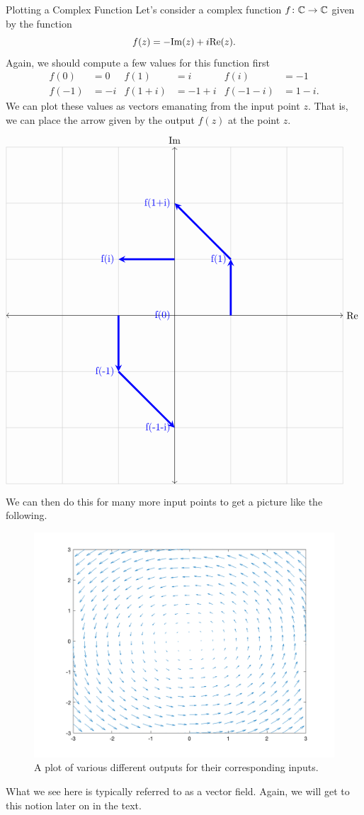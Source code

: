 \begin{ex}{Plotting a Complex Function}
	Let's consider a complex function $f\colon \mathbb{C} \to \mathbb{C}$ given by the function
	\[
		f(z) = -\mathrm{Im}(z)+i\mathrm{Re}(z).
	\]
	Again, we should compute a few values for this function first
	\begin{align*}
		f(0)&= 0 & f(1)&=i & f(i)&= -1\\
		f(-1)&= -i & f(1+i)&= -1+i & f(-1 -i) &= 1 - i.
	\end{align*}
	We can plot these values as vectors emanating from the input point $z$. That is, we can place the arrow given by the output $f(z)$ at the point $z$.  
	\[
	        \begin{tikzpicture}[scale=2]
	        \draw[thin,gray!40] (-3,-3) grid (3,3);
	        \draw[<->] (-3,0)--(3,0) node[right]{$\RE$};
	        \draw[<->] (0,-3)--(0,3) node[above]{$\IM$};
	        \draw[line width=2pt,blue,-](0,0)--(0,0) node[anchor=east] at (0,0){f(0)};
	        \draw[line width=2pt,blue,-stealth](1,0)--(1,1) node[anchor=east] at (1,1){f(1)};
	        \draw[line width=2pt,blue,-stealth](-1,0)--(-1,-1) node[anchor=east] at (-1,-1){f(-1)};
	        \draw[line width=2pt,blue,-stealth](0,1)--(-1,1) node[anchor=east] at (-1,1){f(i)};
	        \draw[line width=2pt,blue,-stealth](1,1)--(0,2) node[anchor=east] at (0,2){f(1+i)};
	        \draw[line width=2pt,blue,-stealth](-1,-1)--(0,-2) node[anchor=east] at (0,-2){f(-1-i)};
	        \end{tikzpicture}
	  \]
	  We can then do this for many more input points to get a picture like the following.
		\begin{figure}[H]
			\centering
			\includegraphics[width=\textwidth]{Figures_Part_5/complex_function_visual.png}
			\caption{A plot of various different outputs for their corresponding inputs.}
		\end{figure}
		What we see here is typically referred to as a vector field. Again, we will get to this notion later on in the text.
\end{ex}
		
